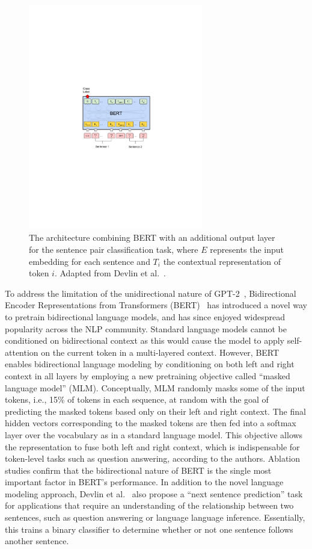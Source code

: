 \begin{figure}[b!]
\centering
  \includegraphics[width=3in]{figures/bert.pdf}
\caption{The architecture combining BERT with an additional output layer for the sentence pair classification task, where $ E $ represents the input embedding for each sentence and $ T_i $ the contextual representation of token $ i $. Adapted from Devlin et al.~\cite{devlin2018bert}.}
\label{fig:bert}
\end{figure}

To address the limitation of the unidirectional nature of GPT-2~\cite{radford2019language}, Bidirectional Encoder Representations from Transformers (BERT)~\cite{devlin2018bert} has introduced a novel way to pretrain bidirectional language models, and has since enjoyed widespread popularity across the NLP community.
Standard language models cannot be conditioned on bidirectional context as this would cause the model to apply self-attention on the current token in a multi-layered context.
However, BERT enables bidirectional language modeling by conditioning on both left and right context in all layers by employing a new pretraining objective called ``masked language model'' (MLM).
Conceptually, MLM randomly masks some of the input tokens, i.e., 15\% of tokens in each sequence, at random with the goal of predicting the masked tokens based only on their left and right context.
The final hidden vectors corresponding to the masked tokens are then fed into a softmax layer over the vocabulary as in a standard language model.
This objective allows the representation to fuse both left and right context, which is indispensable for token-level tasks such as question answering, according to the authors.
Ablation studies confirm that the bidirectional nature of BERT is the single most important factor in BERT's performance.
In addition to the novel language modeling approach, Devlin et al.~\cite{devlin2018bert} also propose a ``next sentence prediction'' task for applications that require an understanding of the relationship between two sentences, such as question answering or language language inference.
Essentially, this trains a binary classifier to determine whether or not one sentence follows another sentence.

